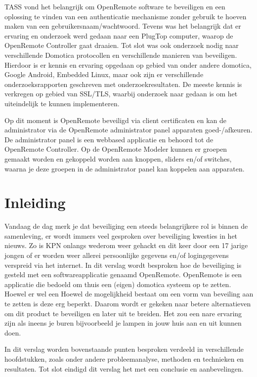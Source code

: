 \documentclass[]{article}
\begin{document}
TASS vond het belangrijk om OpenRemote software te beveiligen en een oplossing
te vinden van een authenticatie mechanisme zonder gebruik te hoeven maken van
een gebruikersnaam/wachtwoord. Tevens was het belangrijk dat er ervaring en
onderzoek werd gedaan naar een PlugTop computer, waarop de OpenRemote Controller
gaat draaien. Tot slot was ook onderzoek nodig naar verschillende Domotica
protocollen en verschillende manieren van beveiligen.  Hierdoor is er kennis en
ervaring opgedaan op gebied van onder andere domotica, Google Android, Embedded
Linux, maar ook zijn er verschillende onderzoeksrapporten geschreven met
onderzoekresultaten. De meeste kennis is verkregen op gebied van SSL/TLS,
waarbij onderzoek naar gedaan is om het uiteindelijk te kunnen implementeren. 

Op dit moment is OpenRemote beveiligd via client certificaten en kan de
administrator via de OpenRemote administrator panel apparaten goed-/afkeuren. De
administrator panel is een webbased applicatie en behoord tot de OpenRemote
Controller. Op de OpenRemote Modeler kunnen er groepen gemaakt worden en
gekoppeld worden aan knoppen, sliders en/of switches, waarna je deze groepen in
de administrator panel kan koppelen aan apparaten.

\newpage
\section{Inleiding}
Vandaag de dag merk je dat beveiliging een steeds belangrijkere rol is binnen
de samenleving, er wordt immers veel gesproken over beveiliging kwesties in
het nieuws. Zo is KPN onlangs wederom weer gehackt en dit keer door een 17
jarige jongen of
er worden weer allerei persoonlijke gegevens en/of logingegevens verspreid via het
internet.
In dit verslag wordt besproken hoe de beveiliging is gesteld met een
softwareapplicatie genaamd OpenRemote. OpenRemote is een applicatie die
bedoeld om thuis een (eigen) domotica systeem op te zetten. Hoewel er wel een
Hoewel de mogelijkheid bestaat om een vorm van beveiling aan te zetten is deze
erg beperkt. Daarom wordt er gekeken naar betere
alternatieven om dit product te beveiligen en later uit te breiden. Het zou een
nare ervaring zijn als ineens je buren bijvoorbeeld je lampen in jouw huis aan en uit
kunnen doen.

In dit verslag worden bovenstaande punten besproken verdeeld in verschillende
hoofdstukken, zoals onder andere probleemanalyse, methoden en technieken en resultaten.
Tot slot eindigd dit verslag het met een conclusie en aanbevelingen.
\end{document}
